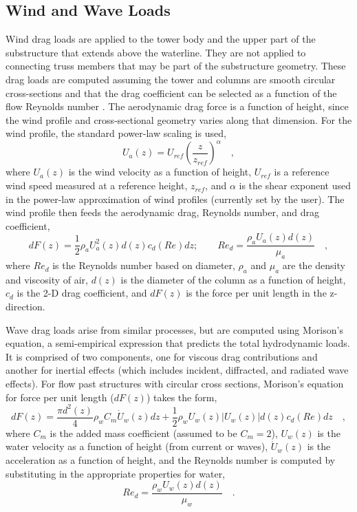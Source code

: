 \subsection{Wind and Wave Loads}
Wind drag loads are applied to the tower body and the upper part of the
substructure that extends above the waterline.  They are not applied to
connecting truss members that may be part of the substructure geometry.
These drag loads are computed assuming the tower and columns are smooth
circular cross-sections and that the drag coefficient can be selected as
a function of the flow Reynolds number \citep{Roshko}.  The aerodynamic
drag force is a function of height, since the wind profile and
cross-sectional geometry varies along that dimension.  For the wind
profile, the standard power-law scaling is used,
\begin{equation}
  U_a(z) = U_{ref}\left(\frac{z}{z_{ref}}\right)^{\alpha}\quad,
\end{equation}
where $U_a(z)$ is the wind velocity as a function of height, $U_{ref}$
is a reference wind speed measured at a reference height, $z_{ref}$, and
$\alpha$ is the shear exponent used in the power-law approximation of
wind profiles (currently set by the user).  The wind profile then feeds
the aerodynamic drag, Reynolds number, and drag coefficient,
\begin{equation} \label{eqn:drag}
  dF(z) = \frac{1}{2} \rho_a U_a^2(z) d(z) c_d(Re) dz;\qquad
  Re_d = \frac{\rho_a U_a(z) d(z)}{\mu_a}\quad,
\end{equation}
where $Re_d$ is the Reynolds number based on diameter, $\rho_a$ and
$\mu_a$ are the density and viscosity of air, $d(z)$ is the diameter of
the column as a function of height, $c_d$ is the 2-D drag coefficient, and
$dF(z)$ is the force per unit length in the z-direction.

Wave drag loads arise from similar processes, but are computed using
Morison's equation, a semi-empirical expression that predicts the total
hydrodynamic loads.  It is comprised of two components, one for viscous
drag contributions and another for inertial effects (which includes
incident, diffracted, and radiated wave effects).  For flow past
structures with circular cross sections, Morison's equation for force
per unit length ($dF(z)$) takes the form,
\begin{equation} \label{eqn:morison}
  dF(z) = \frac{\pi d^2(z)}{4} \rho_w C_m \dot{U}_w(z)dz + \frac{1}{2}
  \rho_w U_w(z) \left| U_w(z)\right| d(z) c_d(Re)dz\quad,
\end{equation}
where $C_m$ is the added mass coefficient (assumed to be $C_m=2$),
$U_w(z)$ is the water velocity as a function of height (from current or
waves), $\dot{U}_w(z)$ is the acceleration as a function of height, and
the Reynolds number is computed by substituting in the appropriate
properties for water,
\begin{equation}
Re_d = \frac{\rho_w U_w(z) d(z)}{\mu_w}\quad.
\end{equation}

